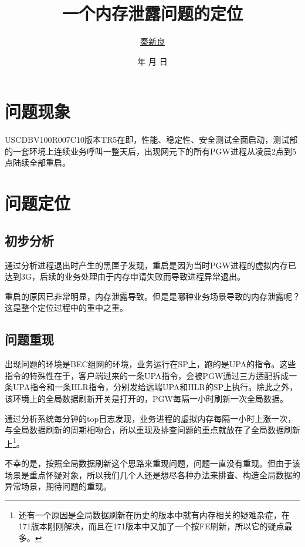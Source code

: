\documentclass[a4paper, 11pt, titlepage]{article}
\newcommand*{\TitleFont}{\usefont{\encodingdefault}{\rmdefault}{b}{n}\fontsize{32}{40}\selectfont}
\renewcommand{\today}{\number\year 年 \number\month 月 \number\day 日}
\begin{document}
\setlength{\parindent}{2em}

\title{\TitleFont 一个内存泄露问题的定位}
\author{\href{mailto:qinxinliang@huawei.com}{秦新良}}
\date{\today}

\maketitle

\tableofcontents
\newpage

\section{问题现象}
USCDBV100R007C10版本TR5在即，性能、稳定性、安全测试全面启动，测试部的一套环境上连续业务呼叫一整天后，出现网元下的所有PGW进程从凌晨2点到5点陆续全部重启。

\section{问题定位}
\subsection{初步分析}
通过分析进程退出时产生的黑匣子发现，重启是因为当时PGW进程的虚拟内存已达到3G，后续的业务处理由于内存申请失败而导致进程异常退出。

重启的原因已非常明显，内存泄露导致。但是是哪种业务场景导致的内存泄露呢？这是整个定位过程中的重中之重。

\subsection{问题重现}
出现问题的环境是BEC组网的环境，业务运行在SP上，跑的是UPA的指令。这些指令的特殊性在于，客户端过来的一条UPA指令，会被PGW通过三方适配拆成一条UPA指令和一条HLR指令，分别发给远端UPA和HLR的SP上执行。除此之外，该环境上的全局数据刷新开关是打开的，PGW每隔一小时刷新一次全局数据。

通过分析系统每分钟的top日志发现，业务进程的虚拟内存每隔一小时上涨一次，与全局数据刷新的周期相吻合，所以重现及排查问题的重点就放在了全局数据刷新上\footnote{还有一个原因是全局数据刷新在历史的版本中就有内存相关的疑难杂症，在171版本刚刚解决，而且在171版本中又加了一个按FE刷新，所以它的疑点最多。}。

不幸的是，按照全局数据刷新这个思路来重现问题，问题一直没有重现。但由于该场景是重点怀疑对象，所以我们几个人还是想尽各种办法来排查、构造全局数据的异常场景，期待问题的重现。
\end{document}
